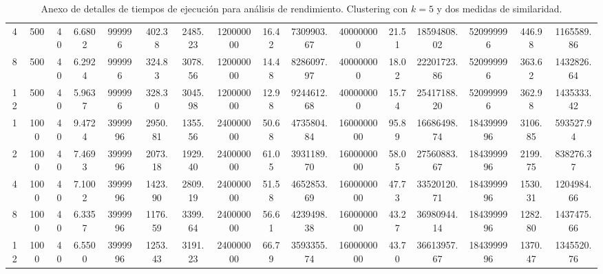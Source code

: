 \begin{landscape}
\begin{table}[h!]
\begin{tabularx}{\hsize}{cccccccccccccccc}
	4  & 500  & 40 & 6.6802 & 999996  & 402.38  & 2485.23 & 120000000 & 16.42 & 7309903.67  & 400000000  & 21.51 & 18594808.02 & 520999996  & 446.98  & 1165589.86 \\
	8  & 500  & 40 & 6.2924 & 999996  & 324.83  & 3078.56 & 120000000 & 14.48 & 8286097.97  & 400000000  & 18.02 & 22201723.86 & 520999996  & 363.62  & 1432826.64 \\
	12 & 500  & 40 & 5.9637 & 999996  & 328.30  & 3045.98 & 120000000 & 12.98 & 9244612.68  & 400000000  & 15.74 & 25417188.20 & 520999996  & 362.98  & 1435333.42 \\
	1  & 1000 & 40 & 9.4724 & 3999996 & 2950.81 & 1355.56 & 240000000 & 50.68 & 4735804.84  & 1600000000 & 95.89 & 16686498.74 & 1843999996 & 3106.85 & 593527.94  \\
	2  & 1000 & 40 & 7.4693 & 3999996 & 2073.18 & 1929.40 & 240000000 & 61.05 & 3931189.70  & 1600000000 & 58.05 & 27560883.67 & 1843999996 & 2199.75 & 838276.37  \\
	4  & 1000 & 40 & 7.1002 & 3999996 & 1423.90 & 2809.19 & 240000000 & 51.58 & 4652853.69  & 1600000000 & 47.73 & 33520120.71 & 1843999996 & 1530.31 & 1204984.66 \\
	8  & 1000 & 40 & 6.3357 & 3999996 & 1176.59 & 3399.64 & 240000000 & 56.61 & 4239498.38  & 1600000000 & 43.27 & 36980944.14 & 1843999996 & 1282.80 & 1437475.66 \\
	12 & 1000 & 40 & 6.5500 & 3999996 & 1253.43 & 3191.23 & 240000000 & 66.79 & 3593355.74  & 1600000000 & 43.70 & 36613957.67 & 1843999996 & 1370.47 & 1345520.76 \\
	\bottomrule
	\end{tabularx}
	\caption{Anexo de detalles de tiempos de ejecución para análisis de rendimiento. Clustering con \(k = 5\) y dos medidas de similaridad.}
	\label{tab:anexo-performance}
	\end{table}
\end{landscape}
